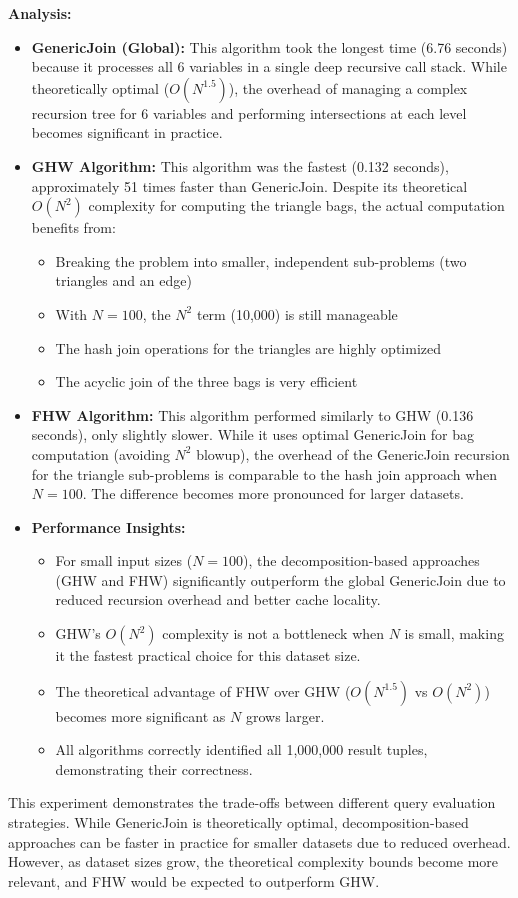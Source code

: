 \documentclass[11pt]{article}
\begin{document}
\textbf{Analysis:}
\begin{itemize}
    \item \textbf{GenericJoin (Global):} This algorithm took the longest time (6.76 seconds) because it processes all 6 variables in a single deep recursive call stack. While theoretically optimal ($O(N^{1.5})$), the overhead of managing a complex recursion tree for 6 variables and performing intersections at each level becomes significant in practice.
    
    \item \textbf{GHW Algorithm:} This algorithm was the fastest (0.132 seconds), approximately 51 times faster than GenericJoin. Despite its theoretical $O(N^2)$ complexity for computing the triangle bags, the actual computation benefits from:
    \begin{itemize}
        \item Breaking the problem into smaller, independent sub-problems (two triangles and an edge)
        \item With $N=100$, the $N^2$ term (10,000) is still manageable
        \item The hash join operations for the triangles are highly optimized
        \item The acyclic join of the three bags is very efficient
    \end{itemize}
    
    \item \textbf{FHW Algorithm:} This algorithm performed similarly to GHW (0.136 seconds), only slightly slower. While it uses optimal GenericJoin for bag computation (avoiding $N^2$ blowup), the overhead of the GenericJoin recursion for the triangle sub-problems is comparable to the hash join approach when $N=100$. The difference becomes more pronounced for larger datasets.
    
    \item \textbf{Performance Insights:}
    \begin{itemize}
        \item For small input sizes ($N=100$), the decomposition-based approaches (GHW and FHW) significantly outperform the global GenericJoin due to reduced recursion overhead and better cache locality.
        \item GHW's $O(N^2)$ complexity is not a bottleneck when $N$ is small, making it the fastest practical choice for this dataset size.
        \item The theoretical advantage of FHW over GHW ($O(N^{1.5})$ vs $O(N^2)$) becomes more significant as $N$ grows larger.
        \item All algorithms correctly identified all 1,000,000 result tuples, demonstrating their correctness.
    \end{itemize}
\end{itemize}

This experiment demonstrates the trade-offs between different query evaluation strategies. While GenericJoin is theoretically optimal, decomposition-based approaches can be faster in practice for smaller datasets due to reduced overhead. However, as dataset sizes grow, the theoretical complexity bounds become more relevant, and FHW would be expected to outperform GHW.
\end{document}
